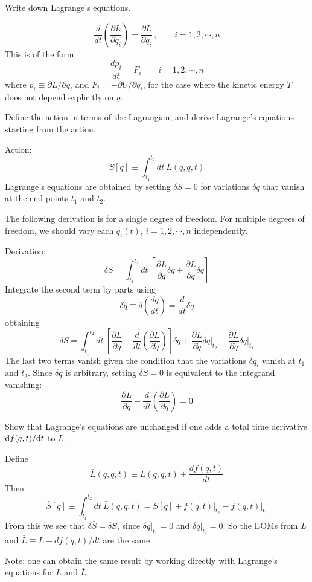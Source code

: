 \documentclass[10pt]{article}
\numberwithin{equation}{section}
\def\be{\begin{equation}}
\def\ee{\end{equation}}
\def\i{\item{}}
\def\d{{\rm{d}}}
\begin{document}
\i Write down Lagrange's equations.

\be
\frac{d}{dt}\left(\frac{\partial L}{\partial \dot q_i}\right)
= \frac{\partial L}{\partial q_i}\,,
\qquad i=1,2,\cdots, n
\ee
%
This is of the form
%
\be
\frac{dp_i}{dt} = F_i
\qquad i=1,2,\cdots, n
\ee
%
where $p_i\equiv \partial L/\partial \dot q_i$ and $F_i = -\partial
U/\partial q_i$, for the case where the kinetic energy 
$T$ does not depend explicitly on $q$.

\i Define the action in terms of the Lagrangian, and derive Lagrange's
equations starting from the action.

Action:
%
\be
S[q] \equiv \int_{t_1}^{t_2} dt\> L(q,\dot q, t) 
\ee
%
Lagrange's equations are obtained by setting $\delta S=0$ for
variations $\delta q$ that vanish at the end points $t_1$ and $t_2$.  

The following derivation is for a single degree of freedom.  For
multiple degrees of freedom, we should vary each $q_i(t)$,
$i=1,2,\cdots, n$ independently.

Derivation:
%
\be
\delta S 
= \int_{t_1}^{t_2} dt\> \left[
\frac{\partial L}{\partial q}\delta q +
\frac{\partial L}{\partial \dot q}\delta \dot q\right]
\ee
%
Integrate the second term by parts using 
\be
\delta \dot q \equiv 
\delta\left(\frac{d q}{d t}\right) 
= \frac{d}{dt}\delta q
\ee
%
obtaining
%
\be
\delta S 
= \int_{t_1}^{t_2} dt\> \left[
\frac{\partial L}{\partial q}
-\frac{d}{dt}\left(\frac{\partial L}{\partial \dot q}\right)\right] \delta q
+ \frac{\partial L}{\partial\dot q}\delta q\bigg|_{t_2}
- \frac{\partial L}{\partial\dot q}\delta q\bigg|_{t_1}
\ee
%
The last two terms vanish given the condition that the variations
$\delta q_i$ vanish at $t_1$ and $t_2$.  Since $\delta q$ is
arbitrary, setting $\delta S=0$ is equivalent to the integrand
vanishing:
%
\be
\frac{\partial L}{\partial q}-\frac{d}{dt}\left(\frac{\partial L}{\partial \dot q}\right) = 0
\ee

\i Show that Lagrange's equations are unchanged if one adds a
total time derivative $\d f(q,t)/\d t$ to $L$.

Define
%
\be
\bar{L}(q,\dot q,t) \equiv L(q,\dot q, t) + \frac{df(q,t)}{dt}
\ee
%
Then
%
\be
\bar{S}[q] \equiv \int_{t_1}^{t_2} dt\> \bar{L}(q,\dot q, t) 
= S[q] + f(q,t)\big|_{t_2} - f(q,t)\big|_{t_1}
\ee
%
From this we see that $\delta \bar{S}=\delta S$, since $\delta
q|_{t_1}=0$ and $\delta q|_{t_2}=0$.  So the EOMs from $L$ and
$\bar{L}\equiv L + df(q,t)/dt$ are the same.

Note: one can obtain the same result by working directly with
Lagrange's equations for $L$ and $\bar L$.
\end{document}
